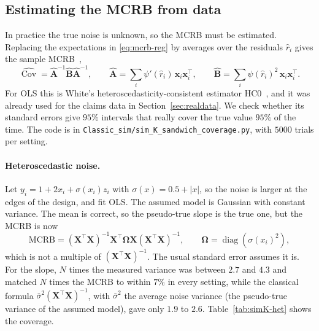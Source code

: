 \documentclass[11pt]{article}
\numberwithin{figure}{section}
\numberwithin{equation}{section}
\begin{document}
\subsection{Estimating the MCRB from data}
\label{sec:mcrb-data}

In practice the true noise is unknown, so the MCRB must be estimated. Replacing the expectations in
\eqref{eq:mcrb-reg} by averages over the residuals $\hat r_i$ gives the sample MCRB~\cite[Section~4.1]{fortunati},
\[
  \widehat{\operatorname{Cov}} = \hat{\mathbf{A}}^{-1}\hat{\mathbf{B}}\hat{\mathbf{A}}^{-1}, \qquad
  \hat{\mathbf{A}} = \sum_i \psi'(\hat r_i)\,\mathbf{x}_i\mathbf{x}_i^\top, \qquad
  \hat{\mathbf{B}} = \sum_i \psi(\hat r_i)^2\,\mathbf{x}_i\mathbf{x}_i^\top .
\]
For OLS this is White's heteroscedasticity-consistent estimator HC0~\cite{white80}, and it was already
used for the claims data in Section~\ref{sec:realdata}. We check whether its standard errors give
$95\%$ intervals that really cover the true value $95\%$ of the time. The code is in
\texttt{Classic\_sim/sim\_K\_sandwich\_coverage.py}, with $5000$ trials per setting.

\paragraph{Heteroscedastic noise.} Let $y_i = 1 + 2x_i + \sigma(x_i)z_i$ with $\sigma(x) = 0.5 + |x|$, so the noise is
larger at the edges of the design, and fit OLS. The assumed model is Gaussian with constant variance.
The mean is correct, so the pseudo-true slope is the true one, but the MCRB is now
\[
  \text{MCRB} = (\mathbf{X}^\top\mathbf{X})^{-1}\mathbf{X}^\top\boldsymbol\Omega\mathbf{X}(\mathbf{X}^\top\mathbf{X})^{-1}, \qquad
  \boldsymbol\Omega = \operatorname{diag}(\sigma(x_i)^2),
\]
which is not a multiple of $(\mathbf{X}^\top\mathbf{X})^{-1}$. The usual standard error assumes it is. For the slope, $N$
times the measured variance was between $2.7$ and $4.3$ and matched $N$ times the MCRB to within $7\%$ in every
setting, while the classical formula $\bar\sigma^2(\mathbf{X}^\top\mathbf{X})^{-1}$, with $\bar\sigma^2$ the average noise
variance (the pseudo-true variance of the assumed model), gave only $1.9$ to $2.6$. Table~\ref{tab:simK-het}
shows the coverage.
\end{document}
